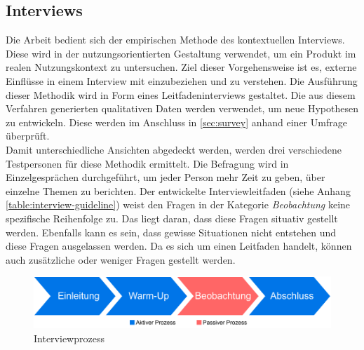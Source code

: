 \subsection{Interviews}\label{sec:interview}
Die Arbeit bedient sich der empirischen Methode des kontextuellen Interviews\cite{contextual-design}.
Diese wird in der nutzungsorientierten Gestaltung verwendet, um ein Produkt im realen Nutzungskontext zu untersuchen.
Ziel dieser Vorgehensweise ist es, externe Einflüsse in einem Interview mit einzubeziehen und zu verstehen.
Die Ausführung dieser Methodik wird in Form eines Leitfadeninterviews\cite[S.559 ff.]{handbuch-methoden-der-empirischen-sozialforschung}\cite[S. 121 ff.]{methoden-in-der-naturwissenschaft} gestaltet.
Die aus diesem Verfahren generierten qualitativen Daten werden verwendet, um neue Hypothesen zu entwickeln.
Diese werden im Anschluss in \autoref{sec:survey} anhand einer Umfrage überprüft.\\

Damit unterschiedliche Ansichten abgedeckt werden, werden drei verschiedene Testpersonen für diese Methodik ermittelt.
Die Befragung wird in Einzelgesprächen durchgeführt, um jeder Person mehr Zeit zu geben, über einzelne Themen zu berichten\cite[S.95]{game-research-methods}.
Der entwickelte Interviewleitfaden (siehe Anhang \autoref{table:interview-guideline}) weist den Fragen in der Kategorie \textit{Beobachtung} keine spezifische Reihenfolge zu.
Das liegt daran, dass diese Fragen situativ gestellt werden.
Ebenfalls kann es sein, dass gewisse Situationen nicht entstehen und diese Fragen ausgelassen werden.
Da es sich um einen Leitfaden handelt, können auch zusätzliche oder weniger Fragen gestellt werden.\\

\begin{figure}[ht]
  \begin{center}
    \includegraphics[width=1\columnwidth]{figures/interview-workflow.pdf}
    \caption{\label{fig:interview-workflow} Interviewprozess}
  \end{center}
\end{figure}

